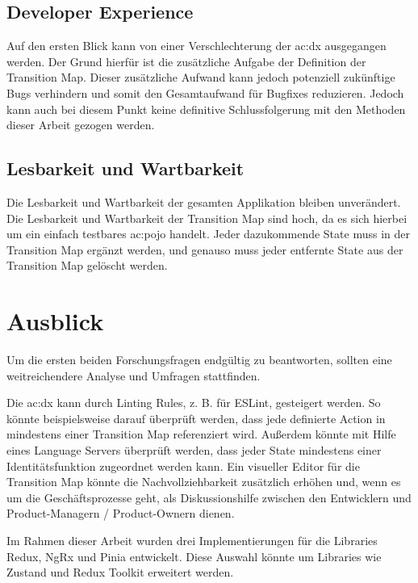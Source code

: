 \subsection{Developer Experience}

Auf den ersten Blick kann von einer Verschlechterung der \acrshort{ac:dx} ausgegangen werden. Der Grund hierfür ist die zusätzliche Aufgabe der Definition der Transition Map. Dieser zusätzliche Aufwand kann jedoch potenziell zukünftige Bugs verhindern und somit den Gesamtaufwand für Bugfixes reduzieren. Jedoch kann auch bei diesem Punkt keine definitive Schlussfolgerung mit den Methoden dieser Arbeit gezogen werden.

\subsection{Lesbarkeit und Wartbarkeit}

Die Lesbarkeit und Wartbarkeit der gesamten Applikation bleiben unverändert. Die Lesbarkeit und Wartbarkeit der Transition Map sind hoch, da es sich hierbei um ein einfach testbares \acrshort{ac:pojo} handelt. Jeder dazukommende State muss in der Transition Map ergänzt werden, und genauso muss jeder entfernte State aus der Transition Map gelöscht werden.

\section{Ausblick}

Um die ersten beiden Forschungsfragen endgültig zu beantworten, sollten eine weitreichendere Analyse und Umfragen stattfinden.

Die \acrshort{ac:dx} kann durch Linting Rules, z. B. für ESLint, gesteigert werden. So könnte beispielsweise darauf überprüft werden, dass jede definierte Action in mindestens einer Transition Map referenziert wird. Außerdem könnte mit Hilfe eines Language Servers überprüft werden, dass jeder State mindestens einer Identitätsfunktion zugeordnet werden kann. Ein visueller Editor für die Transition Map könnte die Nachvollziehbarkeit zusätzlich erhöhen und, wenn es um die Geschäftsprozesse geht, als Diskussionshilfe zwischen den Entwicklern und Product-Managern / Product-Ownern dienen.

Im Rahmen dieser Arbeit wurden drei Implementierungen für die Libraries Redux, NgRx und Pinia entwickelt. Diese Auswahl könnte um Libraries wie Zustand und Redux Toolkit erweitert werden.
